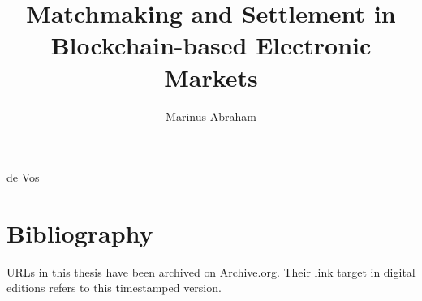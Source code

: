 \documentclass{dissertation}
\begin{document}
\title{Matchmaking and Settlement in Blockchain-based Electronic Markets}
\author{Marinus Abraham}{de Vos}

\frontmatter




\tableofcontents




\mainmatter

\thumbtrue








%
%




%

\thumbfalse

\chapter*{Bibliography}

URLs in this thesis have been archived on Archive.org. Their link target in digital editions refers
to this timestamped version.





\glsaddall
\printglossary[type=\acronymtype,title={Glossary}]



%
\end{document}
